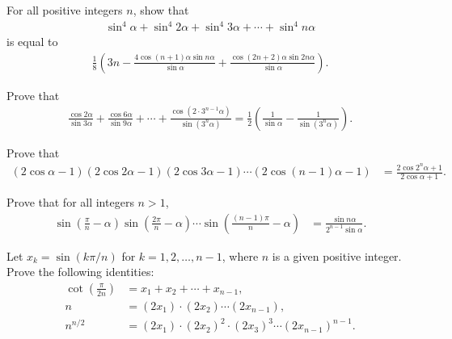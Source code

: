 \documentclass[12pt,a4paper]{memoir}
\theoremstyle{definition}
\begin{document}
\begin{question}
	For all positive integers $n$, show that
	\begin{align*}
		\sin^4 \alpha + \sin^4 2\alpha + \sin^4 3\alpha + \cdots + \sin^4 n\alpha
	\end{align*}
	is equal to
	\begin{align*}
		\frac{1}{8}\left(3n - \frac{4\cos(n+1)\alpha \sin n\alpha }{\sin \alpha} + \frac{\cos(2n+2)\alpha \sin 2n\alpha}{\sin \alpha}\right).
	\end{align*}
\end{question}

\begin{question}
	Prove that
	\begin{align*}
		\frac{\cos 2\alpha}{\sin 3\alpha} + \frac{\cos 6\alpha}{\sin 9\alpha} + \cdots + \frac{\displaystyle\cos\left(2\cdot 3^{n-1}\alpha\right)}{\displaystyle\sin\left(3^n\alpha\right)} = \frac{1}{2}\left(\frac{1}{\sin \alpha} - \frac{1}{\sin(3^n\alpha)}\right).
	\end{align*}
\end{question}

\begin{question}
	Prove that
	\begin{align*}
		\left(2\cos \alpha - 1\right)\left(2\cos 2\alpha - 1\right)\left(2\cos 3\alpha - 1\right)\cdots \left(2\cos (n-1)\alpha - 1\right) &= \frac{2\cos 2^n\alpha+1}{2\cos \alpha + 1}.
	\end{align*}
\end{question}

\begin{question}
	Prove that for all integers $n>1$,
	\begin{align*}
		\sin\left(\frac{\pi}{n}-\alpha\right)\sin\left(\frac{2\pi}{n}-\alpha\right)\cdots \sin\left(\frac{(n-1)\pi}{n}-\alpha\right) &= \frac{\sin n\alpha}{2^{n-1}\sin\alpha}.
	\end{align*}
\end{question}


\begin{question}
	Let $x_k = \sin(k\pi/n)$ for $k=1,2,\dots,n-1$, where $n$ is a given positive integer. Prove the following identities:
	\begin{align*}
		\cot\left(\frac{\pi}{2n}\right) &= x_1 + x_2 + \cdots + x_{n-1},\\
		n &= (2x_1)\cdot (2x_2) \cdots (2x_{n-1}),\\
		n^{n/2} &= (2x_1) \cdot (2x_2)^2 \cdot (2x_3)^3 \cdots (2x_{n-1})^{n-1}.
	\end{align*}
\end{question}
\end{document}
